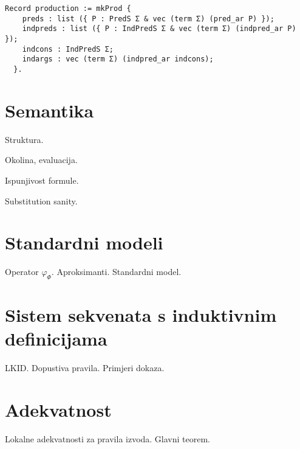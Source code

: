 \begin{verbatim}
Record production := mkProd {
    preds : list ({ P : PredS Σ & vec (term Σ) (pred_ar P) });
    indpreds : list ({ P : IndPredS Σ & vec (term Σ) (indpred_ar P) });
    indcons : IndPredS Σ;
    indargs : vec (term Σ) (indpred_ar indcons);
  }.
\end{verbatim}

\section{Semantika}\label{sec:semantika}
\begin{definition}
  Struktura.
\end{definition}

\begin{definition}
  Okolina, evaluacija.
\end{definition}

\begin{definition}
  Ispunjivost formule.
\end{definition}

\begin{lemma}
  Substitution sanity.
\end{lemma}

\section{Standardni modeli}\label{sec:standardni-modeli}
Operator \(\varphi_{\Phi}\). Aproksimanti. Standardni model.

\section{Sistem sekvenata s induktivnim definicijama}\label{sec:sistem-sekvenata}
LKID. Dopustiva pravila. Primjeri dokaza.

\section{Adekvatnost}\label{sec:adekvatnost}
Lokalne adekvatnosti za pravila izvoda. Glavni teorem.

